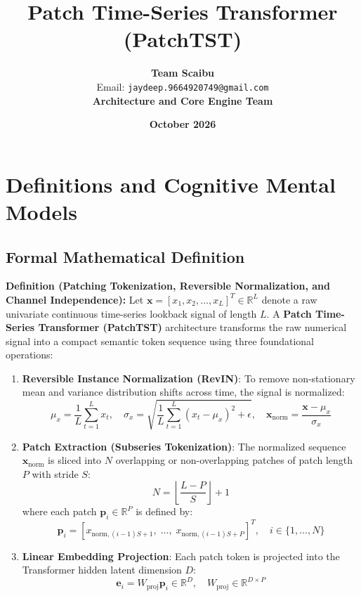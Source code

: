 \documentclass[11pt,a4paper]{article}
\title{\textbf{Patch Time-Series Transformer (PatchTST)}}
\author{\textbf{Team Scaibu} \\ \small Email: \texttt{jaydeep.9664920749@gmail.com} \\ \small \textbf{Architecture and Core Engine Team}}
\date{\textbf{October 2026}}
\theoremstyle{definition}
\begin{document}
\maketitle

\section{Definitions and Cognitive Mental Models}

\subsection{Formal Mathematical Definition}
\textbf{Definition (Patching Tokenization, Reversible Normalization, and Channel Independence):}
Let $\mathbf{x} = [x_1, x_2, \dots, x_L]^T \in \mathbb{R}^L$ denote a raw univariate continuous time-series lookback signal of length $L$. A \textbf{Patch Time-Series Transformer (PatchTST)} architecture transforms the raw numerical signal into a compact semantic token sequence using three foundational operations:

\begin{enumerate}
    \item \textbf{Reversible Instance Normalization (RevIN)}: To remove non-stationary mean and variance distribution shifts across time, the signal is normalized:
    {\boldmath
    \begin{equation}
    \mu_x = \frac{1}{L}\sum_{t=1}^L x_t, \quad \sigma_x = \sqrt{\frac{1}{L}\sum_{t=1}^L (x_t - \mu_x)^2 + \epsilon}, \quad \mathbf{x}_{\text{norm}} = \frac{\mathbf{x} - \mu_x}{\sigma_x}
    \end{equation}
    }
    \item \textbf{Patch Extraction (Subseries Tokenization)}: The normalized sequence $\mathbf{x}_{\text{norm}}$ is sliced into $N$ overlapping or non-overlapping patches of patch length $P$ with stride $S$:
    {\boldmath
    \begin{equation}
    N = \left\lfloor \frac{L - P}{S} \right\rfloor + 1
    \end{equation}
    }
    where each patch $\mathbf{p}_i \in \mathbb{R}^P$ is defined by:
    {\boldmath
    \begin{equation}
    \mathbf{p}_i = [x_{\text{norm}, (i-1)S + 1}, \; \dots, \; x_{\text{norm}, (i-1)S + P}]^T, \quad i \in \{1, \dots, N\}
    \end{equation}
    }
    \item \textbf{Linear Embedding Projection}: Each patch token is projected into the Transformer hidden latent dimension $D$:
    {\boldmath
    \begin{equation}
    \mathbf{e}_i = W_{\text{proj}} \mathbf{p}_i \in \mathbb{R}^D, \quad W_{\text{proj}} \in \mathbb{R}^{D \times P}
    \end{equation}
    }
\end{enumerate}
\end{document}
